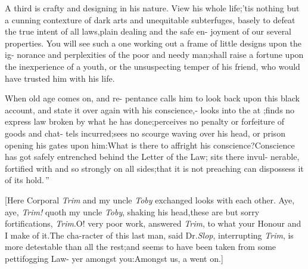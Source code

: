 \documentclass{article}
\begin{document}
\lqq A third is crafty and designing in\break
\lqq his nature. View his whole life;\tsk ’tis\break
\lqq nothing but a cunning contexture of\break
\lqq dark arts and unequitable subterfuges,\break
\lqq basely to defeat the true intent of all\break
\lqq laws,\tsh plain dealing and the safe en-\break
\lqq joyment of our several properties.\tsh{} 
\lqq You will see such a one working out\break
\lqq a frame of little designs upon the ig-\break
\lqq norance and perplexities of the poor\break
\lqq and needy man;\tsk shall raise a fortune\break
\lqq upon the inexperience of a youth, or\break
\lqq the unsuspecting temper of his friend,\break
\lqq who would have trusted him with his\break
\lqq life.

\lqq When old age comes on, and re-\break
\lqq pentance calls him to look back upon\break
\lqq this black account, and state it over\break
\lqq again with his conscience,\tsh {}-\break
\lqq {} looks into the  at\break
\lqq {};\tsk finds no express law broken\break
\lqq by what he has done;\tsk perceives no\break
\lqq penalty or forfeiture of goods and chat-\break
\lqq tels incurred;\tsk sees no scourge waving\break
\lqq over his head, or prison opening his\break
\lqq gates upon him:\tsk What is there to\break
\lqq affright his conscience?\tsk Conscience
\lqq has got safely entrenched behind the\break
\lqq Letter of the Law; sits there invul-\break
\lqq nerable, fortified with  and \break
\lqq {} so strongly on all sides;\tsk that\break
\lqq it is not preaching can dispossess it of\break
\lqq its hold.\,”

[Here Corporal \textit{Trim} and my uncle \textit{Toby} exchanged
looks with each other.\tsk\break
Aye, \tsk aye, \textit{Trim!} quoth my uncle \textit{Toby}, shaking
his head,\tsk these are but sorry fortifications,
\textit{Trim}.\tsh O! very poor work, answered \textit{Trim}, to
what your Ho\-nour and I make of it.\tsh The cha-\break racter of this
last man, said Dr.\@ \textit{Slop}, interrupting \textit{Trim},
is more detestable than\break
all the rest;\tsh and seems to have\break
been taken from some pettifogging Law-\break
yer amongst you:\tsk Amongst us, a\break
{}
went on.]
\end{document}
